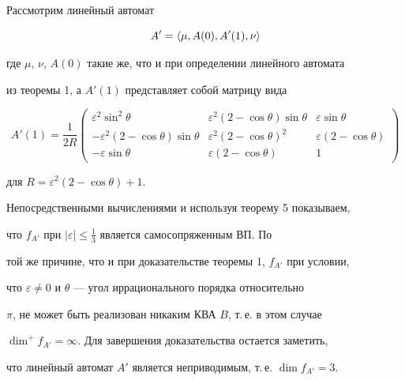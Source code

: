 \begin{pf}


Рассмотрим линейный автомат


$$


A'=\la\mu,A(0),A'(1),\nu\ra


$$


где $\mu$, $\nu$, $A(0)$ такие же, что и при определении линейного автомата


из теоремы 1, а $A'(1)$ представляет собой матрицу вида


$$


A'(1)=\frac{1}{2R}


\begin{pmatrix}


\varepsilon^2\sin^2\theta &


\varepsilon^2(2-\cos\theta)\sin\theta & \varepsilon\sin\theta \\


-\varepsilon^2(2-\cos\theta)\sin\theta &


\varepsilon^2(2-\cos\theta)^2 &


\varepsilon(2-\cos\theta)\\


-\varepsilon\sin\theta & \varepsilon(2-\cos\theta) & 1


\end{pmatrix}


$$


для $R=\varepsilon^2(2-\cos\theta)+1$.





Непосредственными вычислениями и используя теорему 5 показываем,


что $f_{A'}$ при $|\varepsilon|\le\frac{1}{3}$ является самосопряженным ВП. По


той же причине, что и при доказательстве теоремы 1, $f_{A'}$ при условии, 


что $\varepsilon\ne0$ и $\theta$ --- угол иррационального порядка относительно


$\pi$, не может быть реализован никаким КВА $B$, т.\,е. в этом случае


$\dim^+f_{A'}=\infty$. Для завершения доказательства остается заметить,


что линейный автомат $A'$ является неприводимым, т.\,е. $\dim f_{A'}=3$.


\end{pf}





